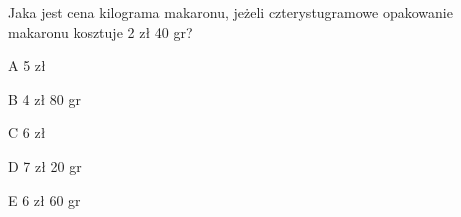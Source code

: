 \begin{tresc}
Jaka jest cena kilograma makaronu, jeżeli czterystugramowe opakowanie makaronu kosztuje 2 zł 40 gr?
\end{tresc}
\begin{wariant}{A} 5 zł \end{wariant}
\begin{wariant}{B} 4 zł 80 gr \end{wariant}
\begin{wariant}{C} 6 zł \end{wariant}
\begin{wariant}{D} 7 zł 20 gr \end{wariant}
\begin{wariant}{E} 6 zł 60 gr \end{wariant}
